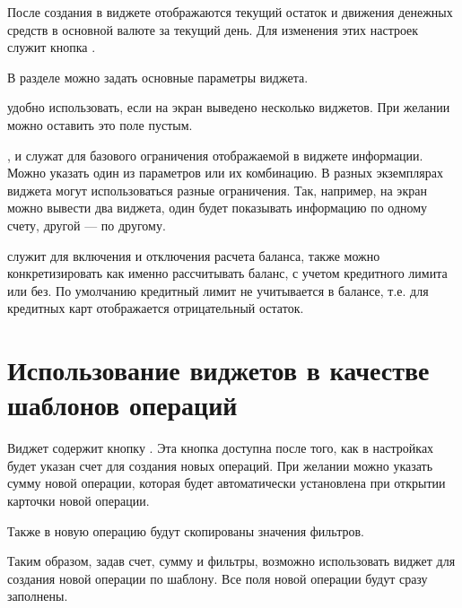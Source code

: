 \documentclass[a4paper,10pt,russian]{sphinxmanual}
\begin{document}
\noindent{}
\noindent{}
\noindent{}

После создания в виджете отображаются текущий остаток и движения денежных средств в основной валюте за текущий день.
Для изменения этих настроек служит кнопка .

В разделе  можно задать основные параметры виджета.

 удобно использовать, если на экран выведено несколько виджетов. При желании можно оставить это поле
пустым.

,  и  служат для базового ограничения отображаемой в
виджете информации. Можно указать один из параметров или их комбинацию. В разных экземплярах виджета могут использоваться
разные ограничения. Так, например, на экран можно вывести два виджета, один будет показывать информацию по одному счету,
другой — по другому.

  служит для включения и отключения расчета баланса, также можно конкретизировать как именно
рассчитывать баланс, с учетом кредитного лимита или без. По умолчанию кредитный лимит не учитывается в балансе, т.е. для
кредитных карт отображается отрицательный остаток.

\noindent{}
\noindent{}


\section{Использование виджетов в качестве шаблонов операций}
\label{\detokenize{widgets:id3}}
Виджет содержит кнопку . Эта кнопка доступна после того, как в настройках будет указан счет для
создания новых операций. При желании можно указать сумму новой операции, которая будет автоматически установлена
при открытии карточки новой операции.

Также в новую операцию будут скопированы значения фильтров.

Таким образом, задав счет, сумму и фильтры, возможно использовать виджет для создания новой операции по шаблону. Все
поля новой операции будут сразу заполнены.
\end{document}
